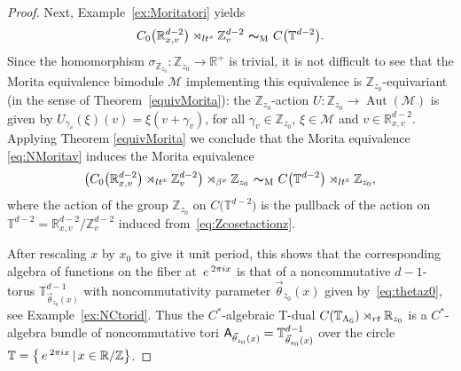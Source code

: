 \documentclass[11pt]{article}
\numberwithin{equation}{section}
\numberwithin{equation}{section}
\newcommand{\Z}{\zed}
\newcommand{\mbf}[1]{{\boldsymbol {#1} }}
\def\ii{{{\rm i}}}
\def\A{{\sf A}}
\newcommand{\sfG}{\mathsf{G}}
\newcommand{\Aut}{\operatorname{Aut}}
\newcommand{\lt}{{\rm lt}}
\newcommand{\rt}{{\rm rt}}
\newcommand{\zed}{{\mathbb Z}} %
\newcommand{\real}{{\mathbb R}} %
\newcommand{\torus}{{\mathbb T}} %
\def\Mcal{{\mathcal M}}
\def\e{{\,\rm e}\,}
\begin{document}
\begin{proof}
Next, Example~\ref{ex:Moritatori} yields
\begin{gather}\label{eq:NMoritav}
C_0\big(\real_{x,v}^{d-2}\big)\rtimes_{\lt^x} \Z_{v}^{d-2} \ \mbf\sim_{\text{\tiny M}} \
C\big(\torus^{d-2}\big) .
\end{gather}
Since the homomorphism
$\sigma_{\Z_{ z_0}}\colon \Z_{ z_0}\to\real^+$ is trivial, it is not difficult to see
that the Morita equivalence bimodule $\Mcal$ implementing this
equivalence is $\Z_{ z_0}$-equivariant (in the sense of Theorem~\ref{equivMorita}):
the $\Z_{ z_0}$-action
$U\colon \Z_{ z_0}\rightarrow \Aut(\Mcal)$ is given by $U_{\gamma_v}(\xi)(v)=\xi(v+\gamma_v)$, for all $\gamma_v\in
\Z_{ z_0}$, $\xi\in \Mcal$ and $v\in \real_{x,v}^{d-2} $.
Applying Theorem \ref{equivMorita} we conclude that the
Morita equivalence \eqref{eq:NMoritav} induces the Morita equivalence
\begin{gather}\label{eq:fibreNCMostow}
\big(C_0\big(\real^{d-2}_{x,v}\big)\rtimes_{\lt^x}\Z^{d-2}_{v}\big) \rtimes_{\beta^x}
\Z_{ z_0} \ \mbf\sim_{\text{\tiny M}} \
C\big(\torus^{d-2}\big)\rtimes_{\lt^x}\Z_{ z_0} ,
\end{gather}
where the action
of the group $\Z_{ z_0}$ on $C\big(\torus^{d-2}\big)$ is the pullback of the action on
$\torus^{d-2}=\real_{x,v}^{d-2}/\Z_{v}^{d-2}$ induced
from~\eqref{eq:Zcosetactionz}.

After rescaling $x$ by $x_0$
to give it unit period, this shows that the
corresponding algebra of functions on the fiber at $\e^{2\pi\ii x}$ is that
of a noncommutative $d{-}1$-torus $\torus_{\vec\theta_{
 z_0}(x)}^{d-1}$ with noncommutativity parameter
$\vec\theta_{z_0}(x)$ given by~\eqref{eq:thetaz0}, see Example~\ref{ex:NCtorid}.
Thus the $C^*$-algebraic T-dual
$C(\torus_{\Lambda_\sfG})\rtimes_\rt\real_{ z_0}$ is a $C^*$-algebra bundle
of noncommutative tori $\A_{\vec\theta_{
 z_0}(x)}=\torus^{d-1}_{\vec\theta_{ z_0}(x)}$ over the
circle $\torus=\big\{\e^{2\pi\ii x}\, | \, x\in \real/\Z\big\}$.
\end{proof}
\end{document}
